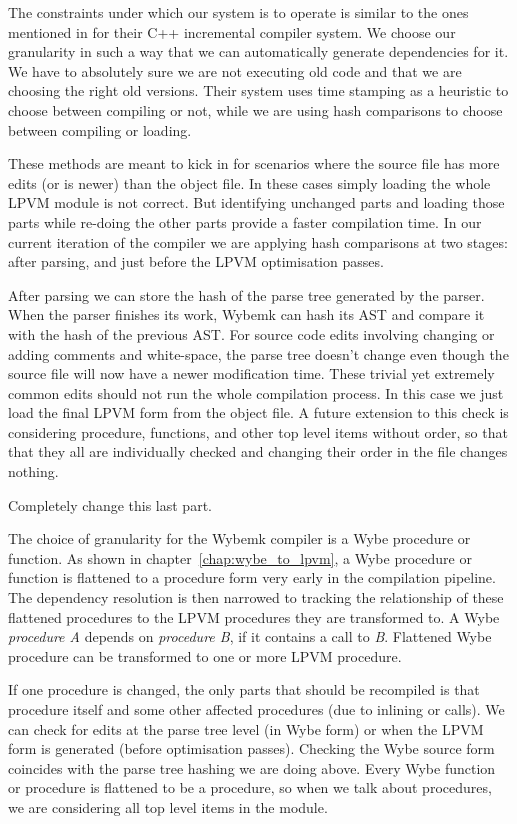 The constraints under which our system is to operate is similar to the ones
mentioned in \cite{cpp_compiler} for their C++ incremental compiler system. We
choose our granularity in such a way that we can automatically generate
dependencies for it. We have to absolutely sure we are not executing old code
and that we are choosing the right old versions. Their system uses time
stamping as a heuristic to choose between compiling or not, while we are using
hash comparisons to choose between compiling or loading.

These methods are meant to kick in for scenarios where the source file has more
edits (or is newer) than the object file. In these cases simply loading the
whole LPVM module is not correct. But identifying unchanged parts and loading
those parts while re-doing the other parts provide a faster compilation
time. In our current iteration of the compiler we are applying hash comparisons
at two stages: after parsing, and just before the LPVM optimisation passes.

After parsing we can store the hash of the parse tree generated by the
parser. When the parser finishes its work, Wybemk can hash its AST and compare
it with the hash of the previous AST. For source code edits involving changing
or adding comments and white-space, the parse tree doesn't change even though
the source file will now have a newer modification time. These trivial yet
extremely common edits should not run the whole compilation process. In this
case we just load the final LPVM form from the object file. A future extension
to this check is considering procedure, functions, and other top level items
without order, so that that they all are individually checked and changing
their order in the file changes nothing.

Completely change this last part.

The choice of granularity for the Wybemk compiler is a Wybe procedure or
function. As shown in chapter~\ref{chap:wybe_to_lpvm}, a Wybe procedure or
function is flattened to a procedure form very early in the compilation
pipeline. The dependency resolution is then narrowed to tracking the
relationship of these flattened procedures to the LPVM procedures they are
transformed to. A Wybe \textit{procedure A} depends on \textit{procedure B}, if
it contains a call to \textit{B}. Flattened Wybe procedure can be transformed
to one or more LPVM procedure.

If one procedure is changed, the only parts that should be recompiled is that
procedure itself and some other affected procedures (due to inlining or
calls). We can check for edits at the parse tree level (in Wybe form) or when
the LPVM form is generated (before optimisation passes). Checking the Wybe
source form coincides with the parse tree hashing we are doing above. Every
Wybe function or procedure is flattened to be a procedure, so when we talk
about procedures, we are considering all top level items in the module.

